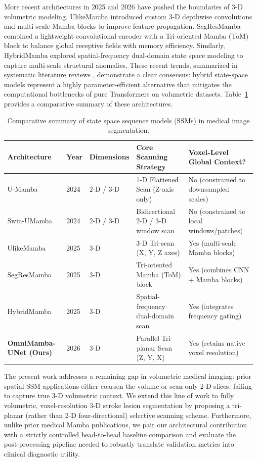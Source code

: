 \documentclass[pdflatex,sn-mathphys-num]{sn-jnl}
\begin{document}
More recent architectures in 2025 and 2026 have pushed the boundaries of 3-D volumetric modeling. UlikeMamba \citep{wang2025ulikemamba} introduced custom 3-D depthwise convolutions and multi-scale Mamba blocks to improve feature propagation. SegResMamba \citep{das2025segresmamba} combined a lightweight convolutional encoder with a Tri-oriented Mamba (ToM) block to balance global receptive fields with memory efficiency. Similarly, HybridMamba \citep{wu2025hybridmamba} explored spatial-frequency dual-domain state space modeling to capture multi-scale structural anomalies. These recent trends, summarized in systematic literature reviews \citep{kurniawan2025mamba}, demonstrate a clear consensus: hybrid state-space models represent a highly parameter-efficient alternative that mitigates the computational bottlenecks of pure Transformers on volumetric datasets. Table~\ref{tab:ssm_comparison} provides a comparative summary of these architectures.

\begin{table}[t]
\caption{Comparative summary of state space sequence models (SSMs) in medical image segmentation.}
\label{tab:ssm_comparison}
\centering
\small
\begin{tabular}{@{}lllll@{}}
\toprule
Architecture & Year & Dimensions & Core Scanning Strategy & Voxel-Level Global Context? \\
\midrule
U-Mamba \citep{ma2024u} & 2024 & 2-D / 3-D & 1-D Flattened Scan (Z-axis only) & No (constrained to downsampled scales) \\
Swin-UMamba \citep{wang2024swinumamba} & 2024 & 2-D / 3-D & Bidirectional 2-D / 3-D window scan & No (constrained to local windows/patches) \\
UlikeMamba \citep{wang2025ulikemamba} & 2025 & 3-D & 3-D Tri-scan (X, Y, Z axes) & Yes (multi-scale Mamba blocks) \\
SegResMamba \citep{das2025segresmamba} & 2025 & 3-D & Tri-oriented Mamba (ToM) block & Yes (combines CNN + Mamba blocks) \\
HybridMamba \citep{wu2025hybridmamba} & 2025 & 3-D & Spatial-frequency dual-domain scan & Yes (integrates frequency gating) \\
\textbf{OmniMamba-UNet (Ours)} & 2026 & 3-D & Parallel Tri-planar Scan (Z, Y, X) & Yes (retains native voxel resolution) \\
\bottomrule
\end{tabular}
\end{table}

The present work addresses a remaining gap in volumetric medical imaging: prior spatial SSM applications either coarsen the volume or scan only 2-D slices, failing to capture true 3-D volumetric context. We extend this line of work to fully volumetric, voxel-resolution 3-D stroke lesion segmentation by proposing a tri-planar (rather than 2-D four-directional) selective scanning scheme. Furthermore, unlike prior medical Mamba publications, we pair our architectural contribution with a strictly controlled head-to-head baseline comparison and evaluate the post-processing pipeline needed to robustly translate validation metrics into clinical diagnostic utility.
\end{document}
